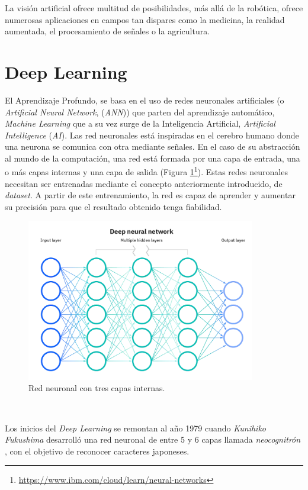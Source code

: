 La visión artificial ofrece multitud de posibilidades, más allá de la robótica, ofrece numerosas aplicaciones en campos tan dispares como la medicina, la realidad aumentada, el procesamiento de señales o la agricultura.\\

\section{Deep Learning}
\label{sec:deeplearning}
El Aprendizaje Profundo, se basa en el uso de redes neuronales artificiales (o {\textit{Artificial Neural Network}}, (\textit{ANN})) que parten del aprendizaje automático, \textit{Machine Learning} que a su vez surge de la Inteligencia Artificial, \textit{Artificial Intelligence} (\textit{AI}). Las red neuronales está inspiradas en el cerebro humano donde una neurona se comunica con otra mediante señales. En el caso de su abstracción al mundo de la computación, una red está formada por una capa de entrada, una o más capas internas y una capa de salida (Figura \ref{fig:neuralnetwork}\footnote{\url{https://www.ibm.com/cloud/learn/neural-networks}}). Estas redes neuronales necesitan ser entrenadas mediante el concepto anteriormente introducido, de \textit{dataset}. A partir de este entrenamiento, la red es capaz de aprender y aumentar su precisión para que el resultado obtenido tenga fiabilidad.\\

\begin{figure} [h!]
	\begin{center}
		\includegraphics[width=10cm]{figs/neuralnetwork}
	\end{center}
	\caption{Red neuronal con tres capas internas.}
	\label{fig:neuralnetwork}
\end{figure}\

Los inicios del \textit{Deep Learning} se remontan al año 1979 cuando \textit{Kunihiko Fukushima} desarrolló una red neuronal de entre 5 y 6 capas llamada \textit{neocognitrón} \cite{neocognitron}, con el objetivo de reconocer caracteres japoneses.\\

